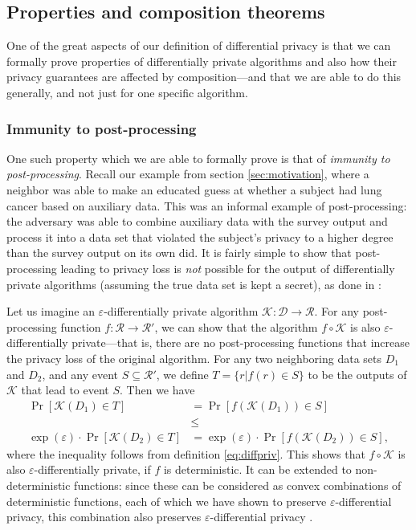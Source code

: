 \documentclass[a4paper,12pt]{article}
\newcommand{\fancy}{\mathcal}
\renewcommand{\epsilon}{\varepsilon}
\begin{document}
\subsection{Properties and composition theorems \label{sec:composition}}

One of the great aspects of our definition of differential privacy is that we can formally prove properties of differentially private algorithms and also how their privacy guarantees are affected by composition---and that we are able to do this generally, and not just for one specific algorithm.

\subsubsection{Immunity to post-processing}

One such property which we are able to formally prove is that of \emph{immunity to post-processing}. Recall our example from section \ref{sec:motivation}, where a neighbor was able to make an educated guess at whether a subject had lung cancer based on auxiliary data. This was an informal example of post-processing: the adversary was able to combine auxiliary data with the survey output and process it into a data set that violated the subject's privacy to a higher degree than the survey output on its own did. It is fairly simple to show that post-processing leading to privacy loss is \emph{not} possible for the output of differentially private algorithms (assuming the true data set is kept a secret), as done in \cite{dwork_privacybook}:

Let us imagine an $\epsilon$-differentially private algorithm $\fancy{K} : \fancy{D} \to \fancy{R}$. For any post-processing function $f : \fancy{R} \to \fancy{R}'$, we can show that the algorithm $f \circ \fancy{K}$ is also $\epsilon$-differentially private---that is, there are no post-processing functions that increase the privacy loss of the original algorithm. For any two neighboring data sets $D_1$ and $D_2$, and any event $S \subseteq \fancy{R}'$, we define $T = \{r|f(r) \in S\}$ to be the outputs of $\fancy{K}$ that lead to event $S$. Then we have
\begin{align*}
    \Pr[\fancy{K}(D_1) \in T] &= \Pr[f(\fancy{K}(D_1)) \in S]  \\
    &\leq \\
    \exp(\epsilon)\cdot\Pr[\fancy{K}(D_2) \in T] &= \exp(\epsilon)\cdot\Pr[f(\fancy{K}(D_2)) \in S],
\end{align*}
where the inequality follows from definition \ref{eq:diffpriv}. This shows that $f \circ \fancy{K}$ is also $\epsilon$-differentially private, if $f$ is deterministic. It can be extended to non-deterministic functions: since these can be considered as convex combinations of deterministic functions, each of which we have shown to preserve $\epsilon$-differential privacy, this combination also preserves $\epsilon$-differential privacy \cite[sec.~2.3]{dwork_privacybook}.
\end{document}
